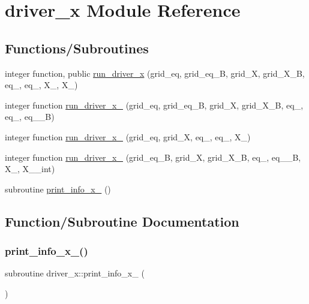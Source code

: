 \hypertarget{namespacedriver__x}{}\section{driver\+\_\+x Module Reference}
\label{namespacedriver__x}
\subsection*{Functions/\+Subroutines}
\begin{DoxyCompactItemize}
\item 
integer function, public \hyperlink{namespacedriver__x_ada3d72a0929daaa5e3da585246d62281}{run\+\_\+driver\+\_\+x} (grid\+\_\+eq, grid\+\_\+eq\+\_\+B, grid\+\_\+X, grid\+\_\+\+X\+\_\+B, eq\+\_, eq\+\_, X\+\_, X\+\_)
\item 
integer function \hyperlink{namespacedriver__x_a2b82a9bc6c0f4af9f3468d03fedc008e}{run\+\_\+driver\+\_\+x\+\_} (grid\+\_\+eq, grid\+\_\+eq\+\_\+B, grid\+\_\+X, grid\+\_\+\+X\+\_\+B, eq\+\_, eq\+\_, eq\+\_\+\_\+B)
\item 
integer function \hyperlink{namespacedriver__x_a454779cefa6da3714d32eedcec0ef7de}{run\+\_\+driver\+\_\+x\+\_} (grid\+\_\+eq, grid\+\_\+X, eq\+\_, eq\+\_, X\+\_)
\item 
integer function \hyperlink{namespacedriver__x_ad3924b3d66f336f0a9a9559eafffec8e}{run\+\_\+driver\+\_\+x\+\_} (grid\+\_\+eq\+\_\+B, grid\+\_\+X, grid\+\_\+\+X\+\_\+B, eq\+\_, eq\+\_\+\_\+B, X\+\_, X\+\_\+\_\+int)
\item 
subroutine \hyperlink{namespacedriver__x_aca49d362e21df044e21d5ba4b2599cf4}{print\+\_\+info\+\_\+x\+\_} ()
\end{DoxyCompactItemize}


\subsection{Function/\+Subroutine Documentation}
\mbox{\label{namespacedriver__x_aca49d362e21df044e21d5ba4b2599cf4}} 
\subsubsection{\texorpdfstring{print\+\_\+info\+\_\+x\+\_()}{print\_info\_x\_2()}}
{\footnotesize\ttfamily subroutine driver\+\_\+x\+::print\+\_\+info\+\_\+x\+\_ (\begin{DoxyParamCaption}{ }\end{DoxyParamCaption})}



